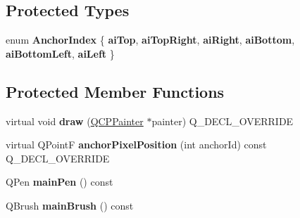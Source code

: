 \subsection*{Protected Types}
\begin{DoxyCompactItemize}
\item 
\mbox{\label{class_q_c_p_item_rect_af0ebba58e6bca4851c4db726691ec0d3}} 
enum {\bfseries Anchor\+Index} \{ \newline
{\bfseries ai\+Top}, 
{\bfseries ai\+Top\+Right}, 
{\bfseries ai\+Right}, 
{\bfseries ai\+Bottom}, 
\newline
{\bfseries ai\+Bottom\+Left}, 
{\bfseries ai\+Left}
 \}
\end{DoxyCompactItemize}
\subsection*{Protected Member Functions}
\begin{DoxyCompactItemize}
\item 
\mbox{\label{class_q_c_p_item_rect_a3c492960d0fc038cf1b60578b62b6cdc}} 
virtual void {\bfseries draw} (\mbox{\hyperlink{class_q_c_p_painter}{Q\+C\+P\+Painter}} $\ast$painter) Q\+\_\+\+D\+E\+C\+L\+\_\+\+O\+V\+E\+R\+R\+I\+DE
\item 
\mbox{\label{class_q_c_p_item_rect_a844027325b33a3b7eef424128ee5109c}} 
virtual Q\+PointF {\bfseries anchor\+Pixel\+Position} (int anchor\+Id) const Q\+\_\+\+D\+E\+C\+L\+\_\+\+O\+V\+E\+R\+R\+I\+DE
\item 
\mbox{\label{class_q_c_p_item_rect_af94d87da501e9429c0e874f1c0369b03}} 
Q\+Pen {\bfseries main\+Pen} () const
\item 
\mbox{\label{class_q_c_p_item_rect_a8813d2d670835ac9b8000c981b8ea6fe}} 
Q\+Brush {\bfseries main\+Brush} () const
\end{DoxyCompactItemize}
